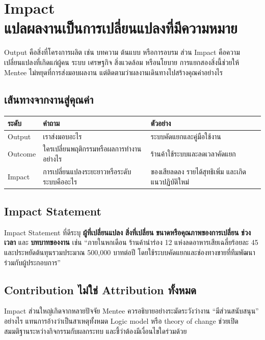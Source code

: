 \chapter{Impact\\แปลผลงานเป็นการเปลี่ยนแปลงที่มีความหมาย}

Output คือสิ่งที่โครงการผลิต เช่น บทความ ต้นแบบ หรือการอบรม ส่วน Impact คือความเปลี่ยนแปลงที่เกิดแก่ผู้คน ระบบ เศรษฐกิจ สิ่งแวดล้อม หรือนโยบาย การแยกสองสิ่งนี้ช่วยให้ Mentee ไม่หยุดที่การส่งมอบผลงาน แต่ติดตามว่าผลงานเดินทางไปสร้างคุณค่าอย่างไร


\section{เส้นทางจากงานสู่คุณค่า}
\begin{longtable}{P{.18\textwidth}P{.34\textwidth}P{.34\textwidth}}
\toprule
\textbf{ระดับ} & \textbf{คำถาม} & \textbf{ตัวอย่าง}\\
\midrule
Output & เราส่งมอบอะไร & ระบบคัดแยกและคู่มือใช้งาน\\
Outcome & ใครเปลี่ยนพฤติกรรมหรือผลการทำงานอย่างไร & ร้านค้าใช้ระบบและลดเวลาคัดแยก\\
Impact & การเปลี่ยนแปลงระยะยาวหรือระดับระบบคืออะไร & ของเสียลดลง รายได้สุทธิเพิ่ม และเกิดแนวปฏิบัติใหม่\\
\bottomrule
\end{longtable}

\section{Impact Statement}
Impact Statement ที่ดีระบุ \textbf{ผู้ที่เปลี่ยนแปลง} \textbf{สิ่งที่เปลี่ยน} \textbf{ขนาดหรือคุณภาพของการเปลี่ยน} \textbf{ช่วงเวลา} และ \textbf{บทบาทของงาน} เช่น \enquote{ภายในหกเดือน ร้านค้านำร่อง 12 แห่งลดอาหารเสียเฉลี่ยร้อยละ 45 และประหยัดต้นทุนรวมประมาณ 500,000 บาทต่อปี โดยใช้ระบบคัดแยกและช่องทางขายที่ทีมพัฒนาร่วมกับผู้ประกอบการ}

\section{Contribution ไม่ใช่ Attribution ทั้งหมด}
Impact ส่วนใหญ่เกิดจากหลายปัจจัย Mentee ควรอธิบายอย่างระมัดระวังว่างาน \enquote{มีส่วนสนับสนุน} อย่างไร แทนการอ้างว่าเป็นสาเหตุทั้งหมด Logic model หรือ theory of change ช่วยเปิดสมมติฐานระหว่างกิจกรรมกับผลกระทบ และชี้ว่าต้องมีเงื่อนไขใดร่วมด้วย

